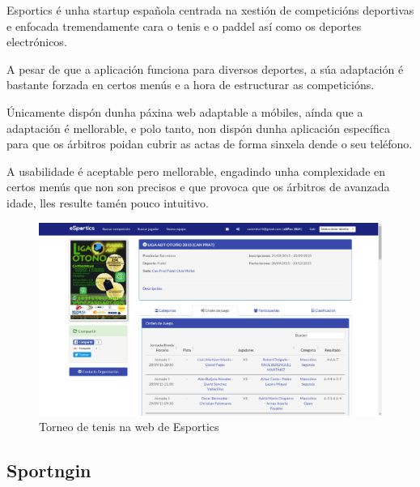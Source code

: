     Esportics é unha startup%
    española centrada na xestión de competicións deportivas e enfocada tremendamente cara
    o tenis e o paddel así como os deportes electrónicos.

A pesar de que a aplicación funciona para diversos deportes, a súa adaptación é bastante 
forzada en certos menús e a hora de estructurar as competicións.

    Únicamente dispón dunha páxina web adaptable a móbiles, aínda que a adaptación é 
mellorable, e polo tanto, non dispón dunha aplicación específica para que os árbitros 
poidan cubrir as actas de forma sinxela dende o seu teléfono.

    A usabilidade é aceptable pero mellorable, engadindo unha complexidade en certos 
menús que non son precisos e que provoca que os árbitros de avanzada idade, lles resulte 
tamén pouco intuitivo.

    \begin{figure}[h!]
      \begin{center}
	\includegraphics[width=\textwidth]{./img/esportics-app.png}
	\caption{Torneo de tenis na web de Esportics}
      \end{center}
    \end{figure}

\clearpage

    \subsection{Sportngin}

     
      
